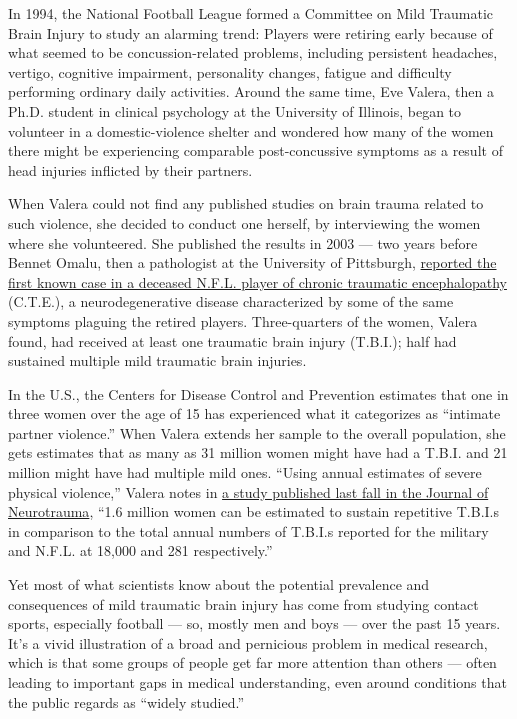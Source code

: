 In 1994, the National Football League formed a Committee on Mild
Traumatic Brain Injury to study an alarming trend: Players were retiring
early because of what seemed to be concussion-related problems,
including persistent headaches, vertigo, cognitive impairment,
personality changes, fatigue and difficulty performing ordinary daily
activities. Around the same time, Eve Valera, then a Ph.D. student in
clinical psychology at the University of Illinois, began to volunteer in
a domestic-violence shelter and wondered how many of the women there
might be experiencing comparable post-concussive symptoms as a result of
head injuries inflicted by their partners.

When Valera could not find any published studies on brain trauma related
to such violence, she decided to conduct one herself, by interviewing
the women where she volunteered. She published the results in 2003 ---
two years before Bennet Omalu, then a pathologist at the University of
Pittsburgh, \href{https://www.ncbi.nlm.nih.gov/pubmed/15987548}{reported
the first known case in a deceased N.F.L. player of chronic traumatic
encephalopathy} (C.T.E.), a neurodegenerative disease characterized by
some of the same symptoms plaguing the retired players. Three-quarters
of the women, Valera found, had received at least one traumatic brain
injury (T.B.I.); half had sustained multiple mild traumatic brain
injuries.

In the U.S., the Centers for Disease Control and Prevention estimates
that one in three women over the age of 15 has experienced what it
categorizes as ``intimate partner violence.'' When Valera extends her
sample to the overall population, she gets estimates that as many as 31
million women might have had a T.B.I. and 21 million might have had
multiple mild ones. ``Using annual estimates of severe physical
violence,'' Valera notes in
\href{https://www.liebertpub.com/doi/abs/10.1089/neu.2018.5734}{a study
published last fall in the Journal of Neurotrauma}, ``1.6 million women
can be estimated to sustain repetitive T.B.I.s in comparison to the
total annual numbers of T.B.I.s reported for the military and N.F.L. at
18,000 and 281 respectively.''

Yet most of what scientists know about the potential prevalence and
consequences of mild traumatic brain injury has come from studying
contact sports, especially football --- so, mostly men and boys --- over
the past 15 years. It's a vivid illustration of a broad and pernicious
problem in medical research, which is that some groups of people get far
more attention than others --- often leading to important gaps in
medical understanding, even around conditions that the public regards as
``widely studied.''

